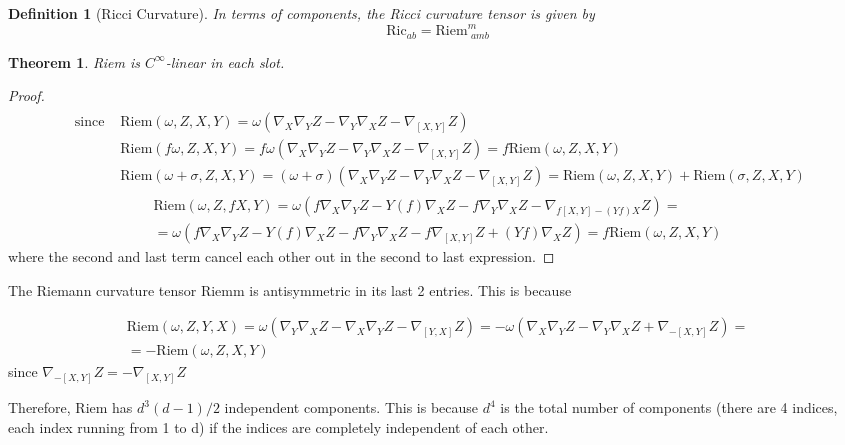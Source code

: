 \documentclass[10pt]{amsart}
\newtheorem{theorem}{Theorem}
\newtheorem{definition}{Definition}
\begin{document}
\begin{multicols*}{2}
\begin{definition}[Ricci Curvature]
In terms of components, the Ricci curvature tensor is given by
\begin{equation}
	\text{Ric}_{ab} = \text{Riem}^m_{\, \, amb}
\end{equation}
\end{definition}

\begin{theorem}
	Riem is $C^{\infty}$-linear in each slot.
\end{theorem}

\begin{proof}
\[
\begin{gathered}
	\begin{aligned}
		\text{ since } & \text{Riem}(\omega, Z, X, Y) = \omega (\nabla_X \nabla_Y Z - \nabla_Y \nabla_X Z - \nabla_{[X,Y]} Z) \\
		& \text{Riem}(f\omega, Z, X, Y) = f\omega (\nabla_X \nabla_Y Z - \nabla_Y \nabla_X Z - \nabla_{[X,Y]} Z) = f\text{Riem}(\omega, Z, X, Y) \\
		& \text{Riem}(\omega + \sigma, Z, X, Y) = (\omega + \sigma) (\nabla_X \nabla_Y Z - \nabla_Y \nabla_X Z - \nabla_{[X,Y]} Z) = \text{Riem}(\omega, Z, X, Y) + \text{Riem}(\sigma, Z, X, Y) 
	\end{aligned} 
\end{gathered}\]
\[
\begin{gathered}
	\text{Riem}(\omega, Z, fX, Y) = \omega (f\nabla_X \nabla_Y Z - Y(f) \nabla_X Z - f\nabla_Y \nabla_X Z -  \nabla_{f[X,Y] - (Yf)X} Z ) = \\
	= \omega (f\nabla_X \nabla_Y Z - Y(f) \nabla_X Z - f\nabla_Y \nabla_X Z - f \nabla_{[X, Y]}Z + (Yf)\nabla_X Z) = f\text{Riem}(\omega, Z, X, Y) 
\end{gathered}\]
where the second and last term cancel each other out in the second to last expression.

\end{proof}

The Riemann curvature tensor Riemm is antisymmetric in its last 2 entries. This is because

\[
\begin{gathered}
	\text{Riem}(\omega, Z, Y, X) = \omega(\nabla_Y \nabla_X Z - \nabla_X \nabla_Y Z - \nabla_{[Y,X]} Z) = -\omega(\nabla_X \nabla_Y Z - \nabla_Y \nabla_X Z + \nabla_{-[X,Y]} Z ) = \\
	= -\text{Riem}(\omega, Z, X, Y)
\end{gathered}
\]
since $\nabla_{-[X,Y]}Z = -\nabla_{[X,Y]}Z$

Therefore, Riem has $d^3 (d-1)/2$ independent components. This is because $d^4$ is the total number of components (there are 4 indices, each index running from 1 to d) if the indices are completely independent of each other. 


\end{multicols*}
\end{document}
